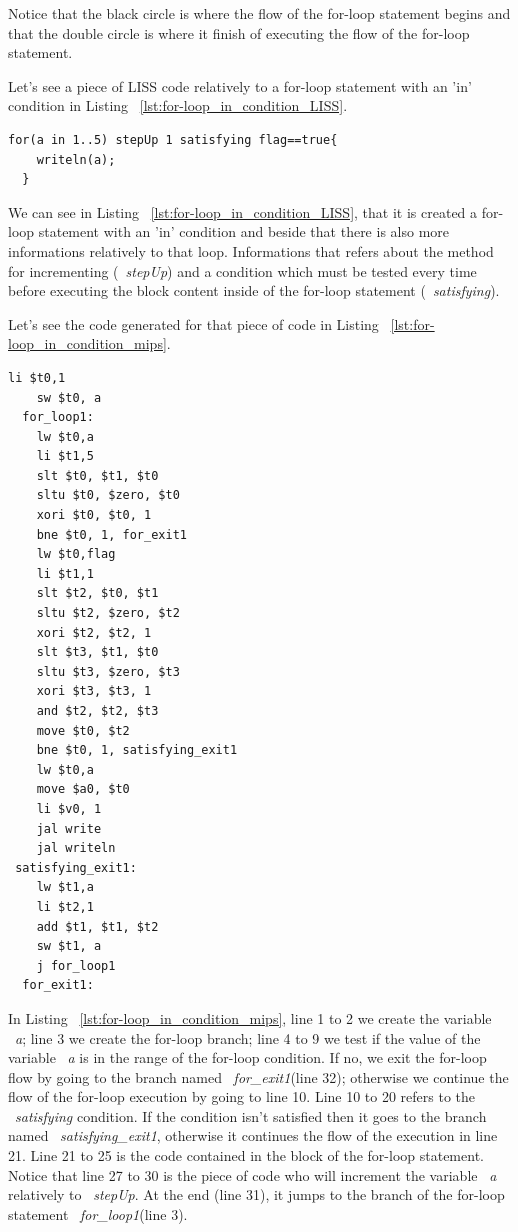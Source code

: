 \documentclass[
  oneside,
  11pt, a4paper,
  footinclude=true,
  headinclude=true,
  cleardoublepage=empty
]{scrbook}
\begin{document}
Notice that the black circle is where the flow of the for-loop statement begins and that the double circle is where it finish of executing the flow of the for-loop statement.

Let's see a piece of LISS code relatively to a for-loop statement with an 'in' condition in Listing ~\ref{lst:for-loop_in_condition_LISS}.

\begin{lstlisting}[caption={Example of a for-loop statement with 'in' condition in LISS},label={lst:for-loop_in_condition_LISS}]
  for(a in 1..5) stepUp 1 satisfying flag==true{
    writeln(a);
  }
\end{lstlisting}

We can see in Listing ~\ref{lst:for-loop_in_condition_LISS}, that it is created a for-loop statement with an 'in' condition and beside that there is also more informations relatively to that loop. Informations that refers about the method for incrementing (~\textit{stepUp}) and a condition which must be tested every time before executing the block content inside of the for-loop statement (~\textit{satisfying}).

Let's see the code generated for that piece of code in Listing ~\ref{lst:for-loop_in_condition_mips}.

\begin{lstlisting}[caption={Code generated for the LISS code in Listing ~\ref{lst:for-loop_in_condition_LISS}},label={lst:for-loop_in_condition_mips}]
    li $t0,1		
    sw $t0, a		
  for_loop1:
    lw $t0,a		
    li $t1,5		
    slt $t0, $t1, $t0	
    sltu $t0, $zero, $t0	
    xori $t0, $t0, 1	
    bne $t0, 1, for_exit1		
    lw $t0,flag		
    li $t1,1		
    slt $t2, $t0, $t1	
    sltu $t2, $zero, $t2	
    xori $t2, $t2, 1	
    slt $t3, $t1, $t0	
    sltu $t3, $zero, $t3	
    xori $t3, $t3, 1	
    and $t2, $t2, $t3	
    move $t0, $t2		
    bne $t0, 1, satisfying_exit1		
    lw $t0,a		
    move $a0, $t0		
    li $v0, 1
    jal write		
    jal writeln		
 satisfying_exit1:
    lw $t1,a		
    li $t2,1		
    add $t1, $t1, $t2	
    sw $t1, a		
    j for_loop1		
  for_exit1:
\end{lstlisting}

In Listing ~\ref{lst:for-loop_in_condition_mips}, line 1 to 2 we create the variable ~\textit{a}; line 3 we create the for-loop branch; line 4 to 9 we test if the value of the variable ~\textit{a} is in the range of the for-loop condition. If no, we exit the for-loop flow by going to the branch named ~\textit{for\_exit1}(line 32); otherwise we continue the flow of the for-loop execution by going to line 10. Line 10 to 20 refers to the ~\textit{satisfying} condition. If the condition isn't satisfied then it goes to the branch named ~\textit{satisfying\_exit1}, otherwise it continues the flow of the execution in line 21. Line 21 to 25 is the code contained in the block of the for-loop statement. Notice that line 27 to 30 is the piece of code who will increment the variable ~\textit{a} relatively to ~\textit{stepUp}. At the end (line 31), it jumps to the branch of the for-loop statement ~\textit{for\_loop1}(line 3).
\end{document}
